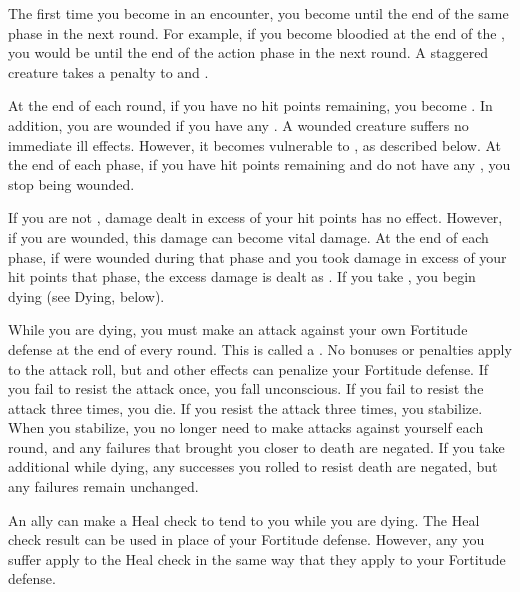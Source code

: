         \label{Staggered}
        The first time you become  in an encounter, you become  until the end of the same phase in the next round.
        For example, if you become bloodied at the end of the , you would be  until the end of the action phase in the next round.
        A staggered creature takes a  penalty to  and .

        \label{Wounded} At the end of each round, if you have no hit points remaining, you become \wounded.
        In addition, you are wounded if you have any .
        A wounded creature suffers no immediate ill effects.
        However, it becomes vulnerable to , as described below.
        At the end of each phase, if you have hit points remaining and do not have any , you stop being wounded.

        \label{Vital Damage}
        If you are not , damage dealt in excess of your hit points has no effect.
        However, if you are wounded, this damage can become vital damage.
        At the end of each phase, if were wounded during that phase and you took damage in excess of your hit points that phase, the excess damage is dealt as .
        If you take , you begin dying (see Dying, below).

        \label{Dying} While you are dying, you must make an attack against your own Fortitude defense at the end of every round.
        This is called a .
        No bonuses or penalties apply to the attack roll, but  and other effects can penalize your Fortitude defense.
        If you fail to resist the attack once, you fall unconscious.
        If you fail to resist the attack three times, you die.
        If you resist the attack three times, you stabilize.
        When you stabilize, you no longer need to make attacks against yourself each round, and any failures that brought you closer to death are negated.
        If you take additional  while dying, any successes you rolled to resist death are negated, but any failures remain unchanged.

        An ally can make a Heal check to tend to you while you are dying.
        The Heal check result can be used in place of your Fortitude defense.
        However, any  you suffer apply to the Heal check in the same way that they apply to your Fortitude defense.


